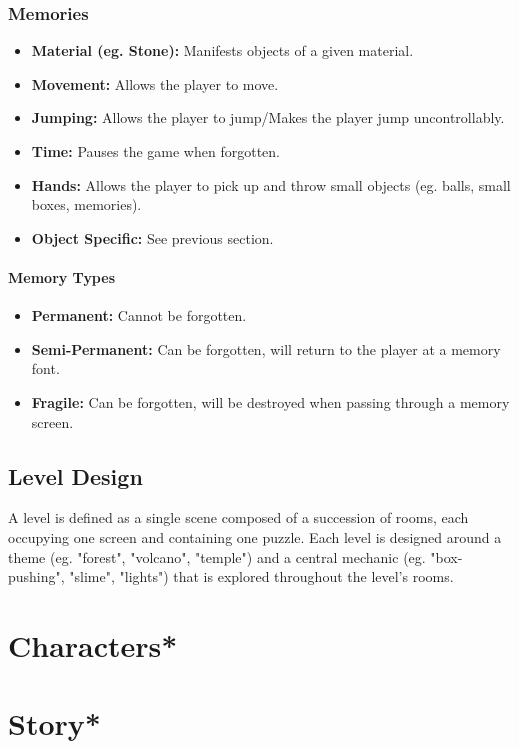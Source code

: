 \documentclass{article}
\begin{document}
\subsubsection{Memories}
\begin{itemize}
    \item \textbf{Material (eg. Stone):} Manifests objects of a given material.
    \item \textbf{Movement:} Allows the player to move.
    \item \textbf{Jumping:} Allows the player to jump/Makes the player jump uncontrollably.
    \item \textbf{Time:} Pauses the game when forgotten.
    \item \textbf{Hands:} Allows the player to pick up and throw small objects (eg. balls, small boxes, memories).
    \item \textbf{Object Specific:} See previous section. 
\end{itemize}

\paragraph{Memory Types}
\begin{itemize}
    \item \textbf{Permanent:} Cannot be forgotten.
    \item \textbf{Semi-Permanent:} Can be forgotten, will return to the player at a memory font.
    \item \textbf{Fragile:} Can be forgotten, will be destroyed when passing through a memory screen.
\end{itemize}

\subsection{Level Design}
A level is defined as a single scene composed of a succession of rooms, each occupying one screen and containing one puzzle.
Each level is designed around a theme (eg. "forest", "volcano", "temple") and a central mechanic (eg. "box-pushing", "slime", "lights") that is explored throughout the level's rooms.

\section{Characters*}

\section{Story*}
\end{document}
